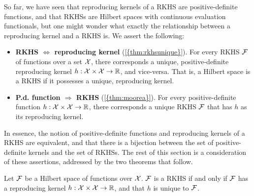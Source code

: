 So far, we have seen that reproducing kernels of a RKHS are positive-definite functions, and that RKHSs are Hilbert spaces with continuous evaluation functionals, but one might wonder what exactly the relationship between a reproducing kernel and a RKHS is.
We assert the following:
\begin{itemize}
  \item \textbf{RKHS $\Leftrightarrow$ reproducing kernel} (\cref{{thm:rkhsunique}}). For every RKHS ${\mathcal F}$ of functions over a set ${\mathcal X}$, there corresponds a unique, positive-definite reproducing kernel $h:{\mathcal X}\times{\mathcal X}\to\mathbb{R}$, and vice-versa. That is, a Hilbert space is a RKHS if it possesses a unique, reproducing kernel.
  \item \textbf{P.d. function $\Rightarrow$ RKHS} (\cref{{thm:moorea}}). For every positive-definite function $h:{\mathcal X}\times{\mathcal X}\to\mathbb{R}$, there corresponds a unique RKHS ${\mathcal F}$ that has $h$ as its reproducing kernel.
\end{itemize}
In essence, the notion of positive-definite functions and reproducing kernels of a RKHS are equivalent, and that there is a bijection between the set of positive-definite kernels and the set of RKHSs.
The rest of this section is a consideration of these assertions, addressed by the two theorems that follow.

\begin{theorem}\label{thm:rkhsunique}
  Let ${\mathcal F}$ be a Hilbert space of functions over ${\mathcal X}$.
  ${\mathcal F}$ is a RKHS if and only if ${\mathcal F}$ has a reproducing kernel $h:{\mathcal X}\times{\mathcal X}\to\mathbb{R}$, and that $h$ is unique to ${\mathcal F}$.
\end{theorem}

